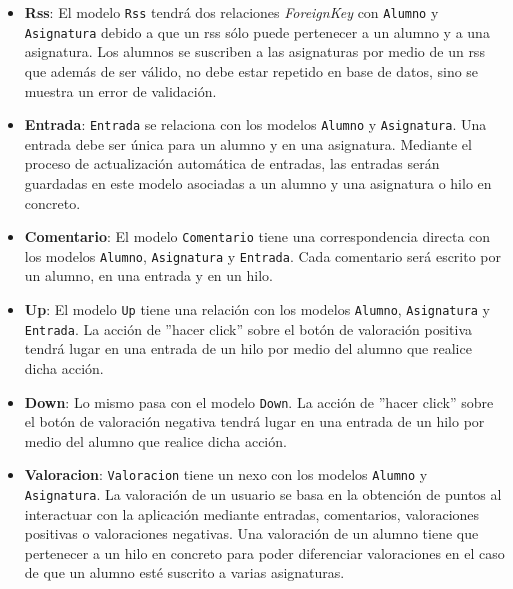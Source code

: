 \documentclass[a4paper, 12pt]{book}
\begin{document}
\begin{itemize}
  Para realizar la relaci\'on \texttt{Asignatura} - \texttt{Alumno} se ha utilizado un modelo intermedio \texttt{Rss} a trav\'es del argumento 
  \textit{Through}. Con este argumento, a la relaci\'on \textit{ManyToMany} se le est\'a se\~nalando que va a actuar un modelo intermediario. El modelo 
  intermediario se utilizar\'a para regular esta relaci\'on por lo que se pueden colocar campos adicionales en \texttt{Rss} para que \texttt{Asignatura}
  pueda acceder a m\'as datos relevantes de \texttt{Alumno}.
  \item {\bfseries Rss}: El modelo \texttt{Rss} tendr\'a dos relaciones \textit{ForeignKey} con \texttt{Alumno} y \texttt{Asignatura} debido
  a que un rss s\'olo puede pertenecer a un alumno y a una asignatura. Los alumnos se suscriben a las asignaturas por medio de un rss que adem\'as de 
  ser v\'alido, no debe estar repetido en base de datos, sino se muestra un error de validaci\'on.
  \item {\bfseries Entrada}: \texttt{Entrada} se relaciona con los modelos \texttt{Alumno} y \texttt{Asignatura}. Una entrada debe ser \'unica para un 
  alumno y en una asignatura. Mediante el proceso de actualizaci\'on autom\'atica de entradas, las entradas ser\'an guardadas en este modelo asociadas
  a un alumno y una asignatura o hilo en concreto.
  \item {\bfseries Comentario}: El modelo \texttt{Comentario} tiene una correspondencia directa con los modelos \texttt{Alumno}, \texttt{Asignatura} y 
  \texttt{Entrada}. Cada comentario ser\'a escrito por un alumno, en una entrada y en un hilo.
  \item {\bfseries Up}: El modelo \texttt{Up} tiene una relaci\'on con los modelos \texttt{Alumno}, \texttt{Asignatura} y \texttt{Entrada}. La acci\'on de 
  ''hacer click'' sobre el bot\'on de valoraci\'on positiva tendr\'a lugar en una entrada de un hilo por medio del alumno que realice dicha acci\'on.
  \item {\bfseries Down}: Lo mismo pasa con el modelo \texttt{Down}. La acci\'on de ''hacer click'' sobre el bot\'on de valoraci\'on negativa tendr\'a 
  lugar en una entrada de un hilo por medio del alumno que realice dicha acci\'on.
  \item {\bfseries Valoracion}: \texttt{Valoracion} tiene un nexo con los modelos \texttt{Alumno} y \texttt{Asignatura}. La valoraci\'on de un usuario se 
  basa en la obtenci\'on de puntos al interactuar con la aplicaci\'on mediante entradas, comentarios, valoraciones positivas o valoraciones negativas.
  Una valoraci\'on de un alumno tiene que pertenecer a un hilo en concreto para poder diferenciar valoraciones en el caso de que un alumno est\'e suscrito
  a varias asignaturas.
\end{itemize}
\end{document}
